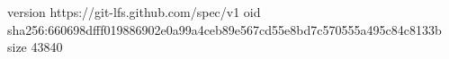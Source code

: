 version https://git-lfs.github.com/spec/v1
oid sha256:660698dfff019886902e0a99a4ceb89e567cd55e8bd7c570555a495c84c8133b
size 43840
